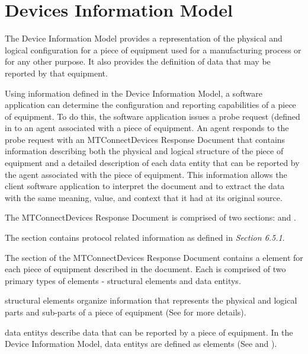 
\section{Devices Information Model}
\label{sec:Devices Information Model}

The \gls{Device Information Model} provides a representation of the physical and logical configuration for a piece of equipment used for a manufacturing process or for any other purpose.  It also provides the definition of data that may be reported by that equipment. 

Using information defined in the \gls{Device Information Model}, a software application can determine the configuration and reporting capabilities of a piece of equipment.  To do this, the software application issues a \gls{probe request} (defined in  to an \gls{agent} associated with a piece of equipment. An \gls{agent} responds to the \gls{probe request} with an \gls{MTConnectDevices Response Document} that contains information describing both the physical and logical structure of the piece of equipment and a detailed description of each \gls{data entity} that can be reported by the \gls{agent} associated with the piece of equipment. This information allows the client software application to interpret the document and to extract the data with the same meaning, value, and context that it had at its original source.  

The \gls{MTConnectDevices Response Document} is comprised of two sections:  and .

The  section contains protocol related information as defined in  \textit{Section 6.5.1}.

The  section of the \gls{MTConnectDevices Response Document} contains a  element for each piece of equipment described in the document.  Each  is comprised of two primary types of elements - \glspl{structural element} and \glspl{data entity}.  

\glspl{structural element} organize information that represents the physical and logical parts and sub-parts of a piece of equipment (See  for more details).  

\glspl{data entity} describe data that can be reported by a piece of equipment.  In the \gls{Device Information Model}, \glspl{data entity} are defined as  elements (See  and ).

